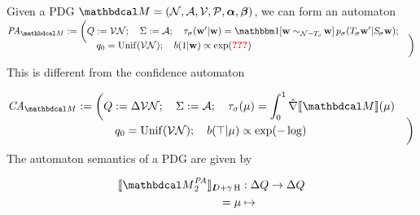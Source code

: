 \documentclass[the-pdg-manual.tex]{subfiles}
\begin{document}
    
    \def\???{{\color{red}\textbf{???}}}
    \begin{constr}
        Given a PDG $\dg M = (\N, \Ar, \V, \mathcal P, \balpha, \bbeta)$, 
        we can form an automaton
        \begin{align*}
            \mathit{PA}_{\dg M} :=
            \smash{\bigg(}&
            Q := \V\N;\quad
                \Sigma := \Ar;  \quad
                \tau_{\sigma}(\mat w' | \mat w) = 
                    \mathbbm1[\mat w \sim_{\N-\Tgt \sigma}\!\mat w]\,
                    p_\sigma(\Tgt \sigma \mat w' | \Src \sigma \mat w);
                \\&\quad
                q_0 = \mathrm{Unif}(\V\N); \quad
                b(1|\mat w) \propto \exp(\???) &
            \smash{\bigg)}
        \end{align*}
    \end{constr}
    
    This is different from the confidence automaton 
    \begin{constr}
        \begin{align*}
            \mathit{CA}_{\dg M} :=
            \smash{\bigg(}&
            Q := \Delta\V\N;\quad
                \Sigma := \Ar;  \quad
                \tau_{\sigma}(\mu) = \int_{0}^{1} \hat\nabla \bbr{\dg M}(\mu) 
                \\&\quad
                q_0 = \mathrm{Unif}(\V\N); \quad
                b(\top|\mu) \propto \exp(- \log ) &
            \smash{\bigg)}
        \end{align*}
    \end{constr}
    
    The automaton semantics of a PDG are given by 
    
    \begin{claim}
        \begin{align*}
            \bbr{ {\dg M}_{2}^{\mathit{PA}} }_{\thickD + \gamma \H} &: \Delta Q \to \Delta Q \\
                = \mu &\mapsto 
        \end{align*}
    \end{claim}
\end{document}
